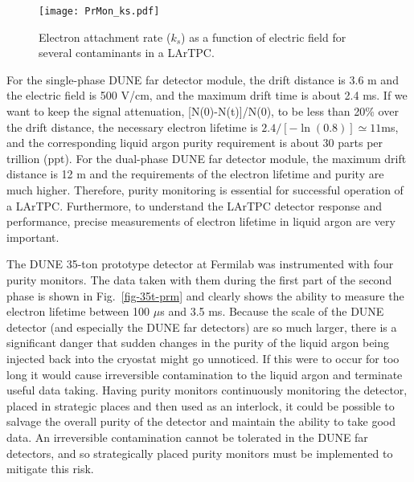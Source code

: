 \begin{figure}[h]
\centering
\texttt{[image: PrMon\_ks.pdf]}
\caption{Electron attachment rate ($k_s$) as a function of electric field for several contaminants in a LArTPC.}\label{fig:ks}
\end{figure}

For the single-phase DUNE far detector module, the drift distance is 3.6 m and the electric field is 500 V/cm, and the maximum drift time is about 2.4 ms. If we want to keep the signal attenuation, [N(0)-N(t)]/N(0), to be less than  20\% over the drift distance, the necessary electron lifetime is $2.4/[-\ln(0.8)] \simeq 11 $ms, and the corresponding liquid argon purity requirement is about 30 parts per trillion (ppt). For the dual-phase DUNE far detector module, the maximum drift distance is 12 m and the requirements of the electron lifetime and purity are much higher. Therefore, purity monitoring is essential for successful operation of a LArTPC. Furthermore, to understand the LArTPC detector response and performance, precise measurements of electron lifetime in liquid argon are very important.


The DUNE 35-ton prototype detector at Fermilab was instrumented with four purity monitors. The data taken with them during the first part of the second phase is shown in Fig.~\ref{fig-35t-prm} and clearly shows the ability to measure the electron lifetime between 100 $\mu$s and 3.5 ms.  Because the scale of the DUNE detector (and especially the DUNE far detectors) are so much larger, there is a significant danger that sudden changes in the purity of the liquid argon being injected back into the cryostat might go unnoticed. If this were to occur for too long it would cause irreversible contamination to the liquid argon and terminate useful data taking.  Having purity monitors continuously monitoring the detector, placed in strategic places and then used as an interlock, it could be possible to salvage the overall purity of the detector and maintain the ability to take good data. An irreversible contamination cannot be tolerated in the DUNE far detectors, and so strategically placed purity monitors must be implemented to mitigate this risk. 



